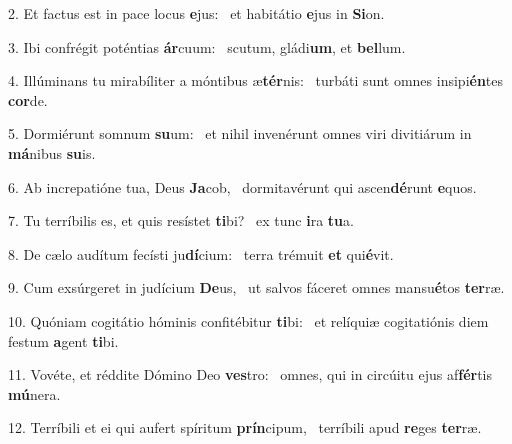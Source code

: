 2. Et factus est in pace locus \textbf{e}jus: \ast\  et habitátio \textbf{e}jus in \textbf{Si}on.\

3. Ibi confrégit poténtias \textbf{ár}cuum: \ast\  scutum, gládi\textbf{um}, et \textbf{bel}lum.\

4. Illúminans tu mirabíliter a móntibus æ\textbf{tér}nis: \ast\  turbáti sunt omnes insipi\textbf{én}tes \textbf{cor}de.\

5. Dormiérunt somnum \textbf{su}um: \ast\  et nihil invenérunt omnes viri divitiárum in \textbf{má}nibus \textbf{su}is.\

6. Ab increpatióne tua, Deus \textbf{Ja}cob, \ast\  dormitavérunt qui ascen\textbf{dé}runt \textbf{e}quos.\

7. Tu terríbilis es, et quis resístet \textbf{ti}bi? \ast\  ex tunc \textbf{i}ra \textbf{tu}a.\

8. De cælo audítum fecísti ju\textbf{dí}cium: \ast\  terra trémuit \textbf{et} qui\textbf{é}vit.\

9. Cum exsúrgeret in judícium \textbf{De}us, \ast\  ut salvos fáceret omnes mansu\textbf{é}tos \textbf{ter}ræ.\

10. Quóniam cogitátio hóminis confitébitur \textbf{ti}bi: \ast\  et relíquiæ cogitatiónis diem festum \textbf{a}gent \textbf{ti}bi.\

11. Vovéte, et réddite Dómino Deo \textbf{ves}tro: \ast\  omnes, qui in circúitu ejus af\textbf{fér}tis \textbf{mú}nera.\

12. Terríbili et ei qui aufert spíritum \textbf{prín}cipum, \ast\  terríbili apud \textbf{re}ges \textbf{ter}ræ.\

